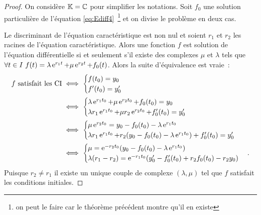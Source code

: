 \begin{proof}
On considère $\mathbb{K}=\mathbb{C}$ pour simplifier les notations. Soit $f_0$ une solution particulière de l'équation \eqref{eq:Ediff4}~\footnote{on peut le faire car le théorème précédent montre qu'il en existe} et on divise le problème en deux cas.

Le discriminant de l'équation caractéristique est non nul et soient $r_1$ et $r_2$ les racines de l'équation caractéristique. Alors une fonction $f$ est solution de l'équation différentielle si et seulement s'il existe des complexes $\mu$ et $\lambda$ tels que $\forall t \in I \ f(t)=\lambda \operatorname{e}^{r_1 t}+ \mu \operatorname{e}^{r_2 t} + f_0(t)$. Alors la suite d'équivalence est vraie~:
  \begin{align}
    f \text{~satisfait les CI} &\iff  \begin{cases}f(t_0)=y_0 \\ f'(t_0)=y'_0 \end{cases}\\
    &\iff  \begin{cases}\lambda \operatorname{e}^{r_1 t_0}+ \mu \operatorname{e}^{r_2 t_0} + f_0(t_0)=y_0 \\ \lambda r_1 \operatorname{e}^{r_1 t_0}+ \mu r_2 \operatorname{e}^{r_2 t_0} + f_0'(t_0)=y'_0 \end{cases}\\ 
    &\iff  \begin{cases}\mu\operatorname{e}^{r_2t_0}=y_0-f_0(t_0)-\lambda \operatorname{e}^{r_1t_0} \\ \lambda r_1 \operatorname{e}^{r_1t_0}+r_2(y_0-f_0(t_0)-\lambda\operatorname{e}^{r_1t_0})+f'_0(t_0)=y'_0 \end{cases}\\ 
    &\iff \begin{cases} \mu=\operatorname{e}^{-r_2t_0}(y_0-f_0(t_0)-\lambda \operatorname{e}^{r_1t_0}) \\ \lambda(r_1-r_2)=\operatorname{e}^{-r_1t_0}(y'_0-f'_0(t_0)+r_2f_0(t_0)-r_2y_0)\end{cases}.
  \end{align}
Puisque $r_2 \neq r_1$ il existe un unique couple de complexe $(\lambda, \mu)$ tel que $f$ satisfait les conditions initiales.


\end{proof}

